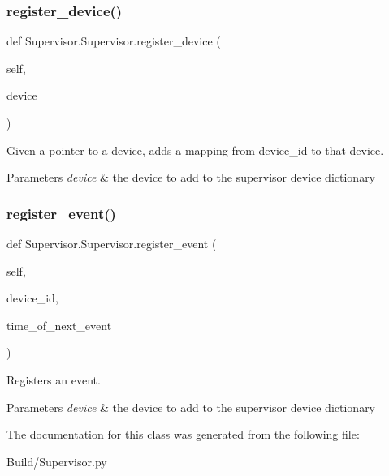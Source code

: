 \subsubsection{\texorpdfstring{register\+\_\+device()}{register\_device()}}
{\footnotesize\ttfamily def Supervisor.\+Supervisor.\+register\+\_\+device (\begin{DoxyParamCaption}\item[{}]{self,  }\item[{}]{device }\end{DoxyParamCaption})}



Given a pointer to a device, adds a mapping from device\+\_\+id to that device. 


\begin{DoxyParams}{Parameters}
{\em device} & the device to add to the supervisor device dictionary \\
\hline
\end{DoxyParams}
\mbox{\label{class_supervisor_1_1_supervisor_aa2199e82392a38e22e391e03885fb4c2}} 
\subsubsection{\texorpdfstring{register\+\_\+event()}{register\_event()}}
{\footnotesize\ttfamily def Supervisor.\+Supervisor.\+register\+\_\+event (\begin{DoxyParamCaption}\item[{}]{self,  }\item[{}]{device\+\_\+id,  }\item[{}]{time\+\_\+of\+\_\+next\+\_\+event }\end{DoxyParamCaption})}



Registers an event. 


\begin{DoxyParams}{Parameters}
{\em device} & the device to add to the supervisor device dictionary \\
\hline
\end{DoxyParams}


The documentation for this class was generated from the following file\+:\begin{DoxyCompactItemize}
\item 
Build/Supervisor.\+py\end{DoxyCompactItemize}
